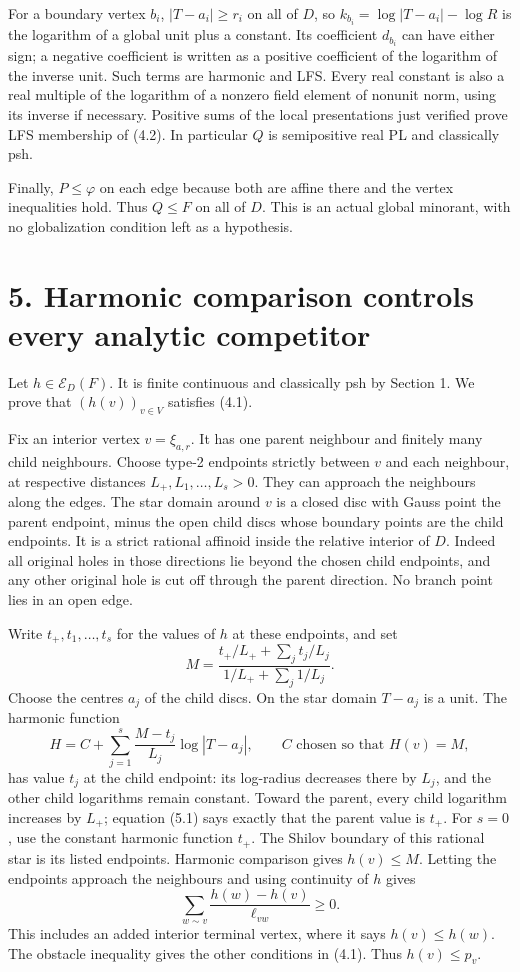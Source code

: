 \documentclass[11pt]{article}
\begin{document}
For a boundary vertex \(b_i\), \(|T-a_i|\geq r_i\) on all of \(D\), so \(k_{b_i}=\log|T-a_i|-\log R\) is the logarithm of a global unit plus a constant. Its coefficient \(d_{b_i}\) can have either sign; a negative coefficient is written as a positive coefficient of the logarithm of the inverse unit. Such terms are harmonic and LFS. Every real constant is also a real multiple of the logarithm of a nonzero field element of nonunit norm, using its inverse if necessary. Positive sums of the local presentations just verified prove LFS membership of (4.2). In particular \(Q\) is semipositive real PL and classically psh.

Finally, \(P\leq\varphi\) on each edge because both are affine there and the vertex inequalities hold. Thus \(Q\leq F\) on all of \(D\). This is an actual global minorant, with no globalization condition left as a hypothesis.

\section*{5. Harmonic comparison controls every analytic competitor}

Let \(h\in\mathcal E_D(F)\). It is finite continuous and classically psh by Section 1. We prove that \((h(v))_{v\in V}\) satisfies (4.1).

Fix an interior vertex \(v=\xi_{a,r}\). It has one parent neighbour and finitely many child neighbours. Choose type-2 endpoints strictly between \(v\) and each neighbour, at respective distances \(L_+,L_1,\ldots,L_s>0\). They can approach the neighbours along the edges. The star domain around \(v\) is a closed disc with Gauss point the parent endpoint, minus the open child discs whose boundary points are the child endpoints. It is a strict rational affinoid inside the relative interior of \(D\). Indeed all original holes in those directions lie beyond the chosen child endpoints, and any other original hole is cut off through the parent direction. No branch point lies in an open edge.

Write \(t_+,t_1,\ldots,t_s\) for the values of \(h\) at these endpoints, and set
\[
M=\frac{t_+/L_++\sum_jt_j/L_j}{1/L_++\sum_j1/L_j}.
\tag{5.1}
\]
Choose the centres \(a_j\) of the child discs. On the star domain \(T-a_j\) is a unit. The harmonic function
\[
H=C+\sum_{j=1}^s\frac{M-t_j}{L_j}\log|T-a_j|,
\qquad C\text{ chosen so that }H(v)=M,
\tag{5.2}
\]
has value \(t_j\) at the child endpoint: its log-radius decreases there by \(L_j\), and the other child logarithms remain constant. Toward the parent, every child logarithm increases by \(L_+\); equation (5.1) says exactly that the parent value is \(t_+\). For \(s=0\), use the constant harmonic function \(t_+\). The Shilov boundary of this rational star is its listed endpoints. Harmonic comparison gives \(h(v)\leq M\). Letting the endpoints approach the neighbours and using continuity of \(h\) gives
\[
\sum_{w\sim v}\frac{h(w)-h(v)}{\ell_{vw}}\geq0.
\]
This includes an added interior terminal vertex, where it says \(h(v)\leq h(w)\). The obstacle inequality gives the other conditions in (4.1). Thus \(h(v)\leq p_v\).
\end{document}
